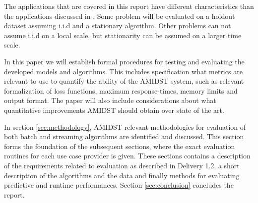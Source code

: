 The applications that are covered in this report have different characteristics than the applications discussed in \cite{Gam12}.  Some problem will be evaluated on a holdout dataset assuming i.i.d and a stationary algorithm.  Other problems can not assume i.i.d on a local scale, but stationarity can be assumed on a larger time scale.  

In this paper we will establish formal procedures for testing and evaluating the developed models and algorithms. This includes specification what metrics are relevant to use to quantify the ability of the AMIDST system, such as relevant formalization of loss functions, maximum response-times, memory limits and output format.  The paper will also include 
considerations about what quantitative improvements AMIDST should obtain over state of the art.

In section \ref{sec:methodology}, AMIDST relevant methodologies for evaluation of both batch and streaming algorithms are identified and discussed.  This section forms the foundation of the subsequent sections, where the exact evaluation routines for each use case provider is given. These sections contains a description of the requirements related to evaluation as described in Delivery 1.2, a short description of the algorithms and the data and finally methods for evaluating predictive and runtime performances.  Section \ref{sec:conclusion} concludes the report.


%
%
